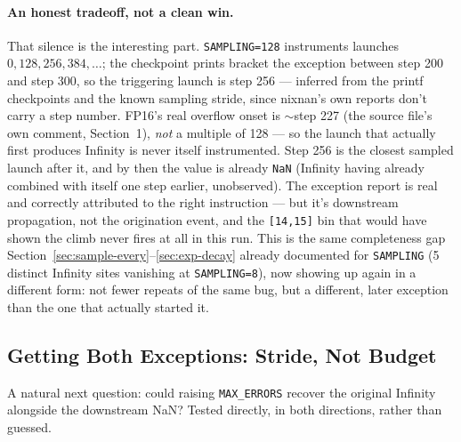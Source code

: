 \documentclass[11pt]{article}
\begin{document}
\paragraph{An honest tradeoff, not a clean win.} That silence is the interesting part.
\texttt{SAMPLING=128} instruments launches $0, 128, 256, 384, \ldots$; the checkpoint
prints bracket the exception between step 200 and step 300, so the triggering launch is
step 256 --- inferred from the printf checkpoints and the known sampling stride, since
nixnan's own reports don't carry a step number. FP16's real overflow onset is
${\sim}$step 227 (the source file's own comment, Section~1), \emph{not} a multiple of 128
--- so the launch that actually first produces Infinity is never itself instrumented.
Step 256 is the closest sampled launch after it, and by then the value is already
\texttt{NaN} (Infinity having already combined with itself one step earlier, unobserved).
The exception report is real and correctly attributed to the right instruction --- but
it's downstream propagation, not the origination event, and the \texttt{[14,15]} bin that
would have shown the climb never fires at all in this run. This is the same
completeness gap Section~\ref{sec:sample-every}--\ref{sec:exp-decay} already
documented for \texttt{SAMPLING} (5 distinct Infinity sites vanishing at
\texttt{SAMPLING=8}), now showing up again in a different form: not fewer repeats of the
same bug, but a different, later exception than the one that actually started it.

\subsection{Getting Both Exceptions: Stride, Not Budget}
\label{sec:sampling-vs-max-errors}

A natural next question: could raising \texttt{MAX\_ERRORS} recover the original
Infinity alongside the downstream NaN? Tested directly, in both directions, rather than
guessed.
\end{document}
